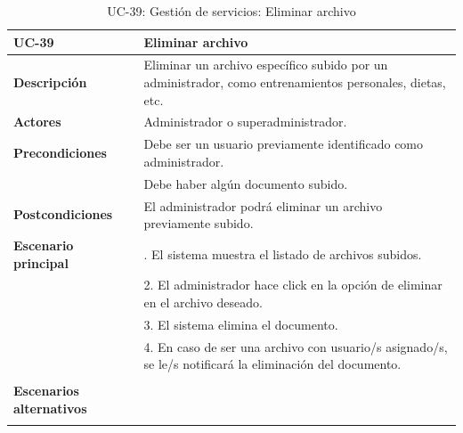 \begin{table}
  \begin{center}
    \begin{tabularx}{16.4cm}{|l|X|}
      \hline
      \textbf{UC-39} & \textbf{Eliminar archivo}\\
      \hline
      \textbf{Descripción} & Eliminar un archivo específico subido por un administrador, como entrenamientos personales, dietas, etc. \\
      \hline
      \textbf{Actores} & Administrador o superadministrador.\\
      \hline
      \textbf{Precondiciones} & Debe ser un usuario previamente identificado como administrador.\\
      & Debe haber algún documento subido.\\
      \hline
      \textbf{Postcondiciones} & El administrador podrá eliminar un archivo previamente subido.\\
      \hline
      \textbf{Escenario principal} & \smallskip 1. El sistema muestra el listado de archivos subidos.\\
      & 2. El administrador hace click en la opción de eliminar en el archivo deseado.\\
      & 3. El sistema elimina el documento.\\
      & 4. En caso de ser una archivo con usuario/s asignado/s, se le/s notificará la eliminación del documento.\\
      & \\
      \hline
      \textbf{Escenarios alternativos} & \\
      & \\
      \hline
    \end{tabularx}
    \caption{UC-39: Gestión de servicios: Eliminar archivo}
    \label{tab:CU-eliminar-archivo}
  \end{center}
\end{table}


